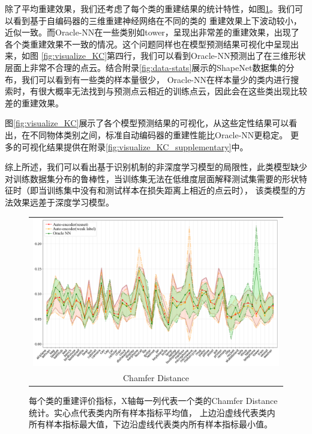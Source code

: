 \documentclass[bachelor, nocolorlinks, printoneside]{seuthesis} %
\begin{document}
\begin{Main}
除了平均重建效果，我们还考虑了每个类的重建结果的统计特性，如图\ref{fig:metric_per_class}。我们可以看到基于自编码器的三维重建神经网络在不同的类的
重建效果上下波动较小，近似一致。而Oracle-NN在一些类别如tower，呈现出非常差的重建效果，出现了各个类重建效果不一致的情况。这个问题同样也在模型预测结果可视化中呈现出来，如图
\ref{fig:visualize_KC}第四行，我们可以看到Oracle-NN预测出了在三维形状层面上非常不合理的点云。结合附录\ref{fig:data-stats}展示的ShapeNet数据集的分布，我们可以看到有一些类的样本量很少，
Oracle-NN在样本量少的类内进行搜索时，有很大概率无法找到与预测点云相近的训练点云，因此会在这些类出现比较差的重建效果。

图\ref{fig:visualize_KC}展示了各个模型预测结果的可视化，从这些定性结果可以看出，在不同物体类别之间，标准自动编码器的重建性能比Oracle-NN更稳定。
更多的可视化结果提供在附录\ref{fig:visualize_KC_supplementary}中。

综上所述，我们可以看出基于识别机制的非深度学习模型的局限性，此类模型缺少对训练数据集分布的鲁棒性，当训练集无法在低维度层面解释测试集需要的形状特征时（即当训练集中没有和测试样本在损失距离上相近的点云时），
该类模型的方法效果远差于深度学习模型。

\begin{figure}
\centering
\begin{tabular}{c@{}}
\includegraphics[width=0.99\columnwidth]{figs/CD_per_shape_roman.png} \\
Chamfer Distance \\
\end{tabular}
\caption{每个类的重建评价指标，X轴每一列代表一个类的Chamfer Distance统计。实心点代表类内所有样本指标平均值，
上边沿虚线代表类内所有样本指标最大值，下边沿虚线代表类内所有样本指标最小值。}
\label{fig:metric_per_class}
\end{figure}


\end{Main}
\end{document}
